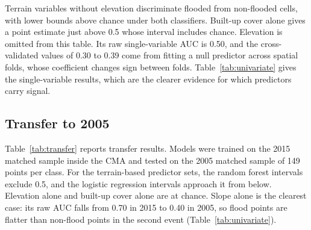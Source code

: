 \documentclass[conference]{IEEEtran}
\begin{document}
Terrain variables without elevation discriminate flooded from non-flooded cells, with lower bounds above chance under both classifiers. Built-up cover alone gives a point estimate just above 0.5 whose interval includes chance. Elevation is omitted from this table. Its raw single-variable AUC is 0.50, and the cross-validated values of 0.30 to 0.39 come from fitting a null predictor across spatial folds, whose coefficient changes sign between folds. Table~\ref{tab:univariate} gives the single-variable results, which are the clearer evidence for which predictors carry signal.

\begin{table}[h]
\centering
\caption{Single-variable ROC-AUC inside the CMA, with 95\% bootstrap intervals. Intervals resample spatial blocks for 2015 and individual points for 2005.}
\label{tab:univariate}
\setlength{\tabcolsep}{3pt}
\end{table}

\subsection{Transfer to 2005}
Table~\ref{tab:transfer} reports transfer results. Models were trained on the 2015 matched sample inside the CMA and tested on the 2005 matched sample of 149 points per class. For the terrain-based predictor sets, the random forest intervals exclude 0.5, and the logistic regression intervals approach it from below. Elevation alone and built-up cover alone are at chance. Slope alone is the clearest case: its raw AUC falls from 0.70 in 2015 to 0.40 in 2005, so flood points are flatter than non-flood points in the second event (Table~\ref{tab:univariate}).
\end{document}
